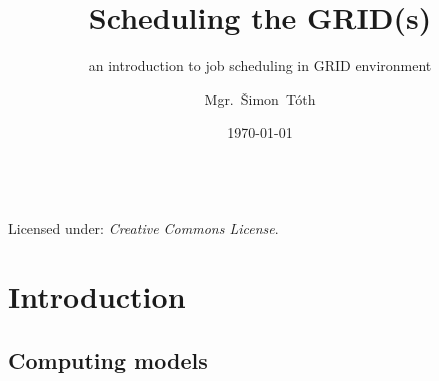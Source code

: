 

\title{Scheduling the GRID(s)}
\subtitle{an introduction to job scheduling in GRID environment}
\author[]{Mgr.~Šimon~Tóth}
\date{\today}

\newcommand{\CcNote}[1]{%
	Licensed under: \textit{Creative Commons #1 3.0 License}.%
}




\begin{frame}
\titlepage
	\vfill
	\begin{center}
		\\ {\tiny\CcNote{\CcLongnameByNcSa}}
		\vspace*{2ex}
	\end{center}
\end{frame}

\section{Introduction}
\subsection{Computing models}

{
\frame{}
}

